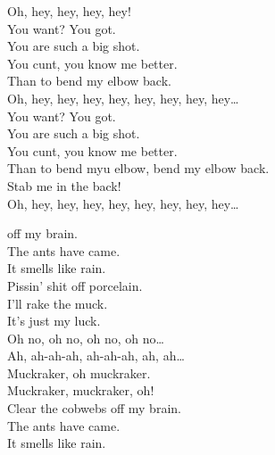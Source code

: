 
\label{album:12-bar-bruise}




Oh, hey, hey, hey, hey! \\

You want? You got. \\
You are such a big shot. \\
You cunt, you know me better. \\
Than to bend my elbow back. \\

Oh, hey, hey, hey, hey, hey, hey, hey, hey… \\

You want? You got. \\
You are such a big shot. \\
You cunt, you know me better. \\
Than to bend myu elbow, bend my elbow back. \\
Stab me in the back! \\

Oh, hey, hey, hey, hey, hey, hey, hey, hey… \\




 off my brain. \\
The ants have came. \\
It smells like rain. \\

Pissin' shit off porcelain. \\
I'll rake the muck. \\
It's just my luck. \\

Oh no, oh no, oh no, oh no… \\

Ah, ah-ah-ah, ah-ah-ah, ah, ah… \\
Muckraker, oh muckraker. \\
Muckraker, muckraker, oh! \\

Clear the cobwebs off my brain. \\
The ants have came. \\
It smells like rain. \\

